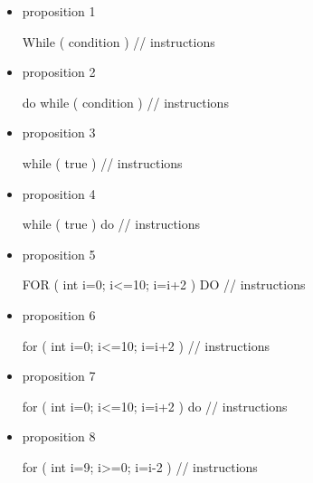 \documentclass[11pt,a4paper]{article}
\begin{document}
            \begin{itemize} 
        
            \item[ \ding{"6F} ] proposition 1
							\begin{Java}
While ( condition ) {
	// instructions
}							\end{Java}
        
            \item[ \ding{"6F} ] proposition 2
							\begin{Java}
do while ( condition ) {
	// instructions
}							\end{Java}
        
            \item[ \ding{"6F} ] proposition 3
							\begin{Java}
while ( true ) {
	// instructions
}							\end{Java}
        
            \item[ \ding{"6F} ] proposition 4
							\begin{Java}
while ( true ) do {
	// instructions
}							\end{Java}
        
            \item[ \ding{"6F} ] proposition 5
							\begin{Java}
FOR ( int i=0; i<=10; i=i+2 ) DO {
	// instructions
}							\end{Java}
        
            \item[ \ding{"6F} ] proposition 6
							\begin{Java}
for ( int i=0; i<=10; i=i+2 ) {
	// instructions
}							\end{Java}
        
            \item[ \ding{"6F} ] proposition 7
							\begin{Java}
for ( int i=0; i<=10; i=i+2 ) do {
	// instructions
}							\end{Java}
        
            \item[ \ding{"6F} ] proposition 8
							\begin{Java}
for ( int i=9; i>=0; i=i-2 ) {
	// instructions
}							\end{Java}
        
            \end{itemize} 
        
\end{document}
